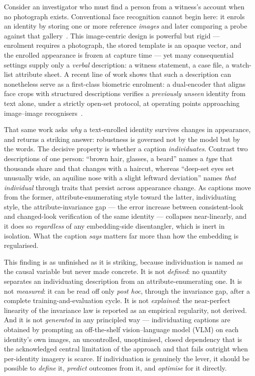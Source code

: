 \documentclass[10pt,twocolumn,letterpaper]{article}
\begin{document}
Consider an investigator who must find a person from a witness's account when no photograph
exists. Conventional face recognition cannot begin here: it enrols an identity by storing one or
more reference \emph{images} and later comparing a probe against that
gallery~\cite{arcface,facenet}. This image-centric design is powerful but rigid --- enrolment
requires a photograph, the stored template is an opaque vector, and the enrolled appearance is
frozen at capture time --- yet many consequential settings supply only a \emph{verbal}
description: a witness statement, a case file, a watch-list attribute sheet. A recent line of
work shows that such a description can nonetheless serve as a first-class biometric enrolment: a
dual-encoder that aligns face crops with structured descriptions verifies a \emph{previously
unseen} identity from text alone, under a strictly open-set protocol, at operating points
approaching image--image recognisers~\cite{semanticbio}.

That same work asks \emph{why} a text-enrolled identity survives changes in appearance, and
returns a striking answer: robustness is governed not by the model but by the words. The
decisive property is whether a caption \emph{individuates}. Contrast two descriptions of one
person: ``brown hair, glasses, a beard'' names a \emph{type} that thousands share and that
changes with a haircut, whereas ``deep-set eyes set unusually wide, an aquiline nose with a
slight leftward deviation'' names \emph{that individual} through traits that persist across
appearance change. As captions move from the former, attribute-enumerating style toward the
latter, individuating style, the attribute-invariance gap --- the error increase between
consistent-look and changed-look verification of the same identity --- collapses near-linearly,
and it does so \emph{regardless} of any embedding-side disentangler, which is inert in isolation.
What the caption \emph{says} matters far more than how the embedding is regularised.

This finding is as unfinished as it is striking, because individuation is named as the causal
variable but never made concrete. It is not \emph{defined}: no quantity separates an
individuating description from an attribute-enumerating one. It is not \emph{measured}: it can be
read off only \emph{post hoc}, through the invariance gap, after a complete
training-and-evaluation cycle. It is not \emph{explained}: the near-perfect linearity of the
invariance law is reported as an empirical regularity, not derived. And it is not
\emph{generated} in any principled way --- individuating captions are obtained by prompting an
off-the-shelf vision--language model (VLM) on each identity's own images, an uncontrolled,
unoptimised, closed dependency that is the acknowledged central limitation of the approach and
that fails outright when per-identity imagery is scarce. If individuation is genuinely the lever,
it should be possible to \emph{define} it, \emph{predict} outcomes from it, and \emph{optimise}
for it directly.
\end{document}
